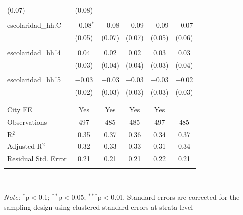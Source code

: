 \begin{table}[H]
\begin{tabularx}{0.9\textwidth}{@{\extracolsep{-7pt}}lccccc}
(0.07) & (0.08) \\    & & & & & \\   escolaridad\_hh.C & $-$0.08$^{*}$ & $-$0.08 & $-$0.09 & $-$0.09 & $-$0.07 \\    & (0.05) & (0.07) & (0.07) & (0.05) & (0.06) \\    & & & & & \\   escolaridad\_hh$\hat{\mkern6mu}$4 & 0.04 & 0.02 & 0.02 & 0.03 & 0.03 \\    & (0.03) & (0.04) & (0.04) & (0.03) & (0.04) \\    & & & & & \\   escolaridad\_hh$\hat{\mkern6mu}$5 & $-$0.03 & $-$0.03 & $-$0.03 & $-$0.03 & $-$0.02 \\    & (0.02) & (0.03) & (0.03) & (0.03) & (0.03) \\    & & & & & \\  \hline \\[-1.8ex]  City FE & Yes & Yes & Yes & Yes &  \\  Observations & 497 & 485 & 485 & 497 & 485 \\  R$^{2}$ & 0.35 & 0.37 & 0.36 & 0.34 & 0.37 \\  Adjusted R$^{2}$ & 0.32 & 0.33 & 0.33 & 0.31 & 0.34 \\  Residual Std. Error & 0.21 & 0.21 & 0.21 & 0.22 & 0.21 \\  \hline  \hline \\[-1.8ex]  \end{tabularx} \\ \parbox[]{\textwidth}{\textit{Note:} $^{*}$p$<$0.1; $^{**}$p$<$0.05; $^{***}$p$<$0.01. Standard errors are corrected for the sampling design using clustered standard errors at strata level }  \end{table} 
